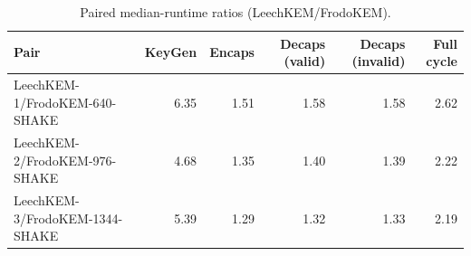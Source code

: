 \begin{table}[t]
\centering
\caption{Paired median-runtime ratios (LeechKEM/FrodoKEM).}
\label{tab:kem-runtime-ratios}
\begin{tabular}{lrrrrr}
\toprule
Pair & KeyGen & Encaps & Decaps (valid) & Decaps (invalid) & Full cycle \\
\midrule
LeechKEM-1/FrodoKEM-640-SHAKE & 6.35 & 1.51 & 1.58 & 1.58 & 2.62 \\
LeechKEM-2/FrodoKEM-976-SHAKE & 4.68 & 1.35 & 1.40 & 1.39 & 2.22 \\
LeechKEM-3/FrodoKEM-1344-SHAKE & 5.39 & 1.29 & 1.32 & 1.33 & 2.19 \\
\bottomrule
\end{tabular}
\end{table}
